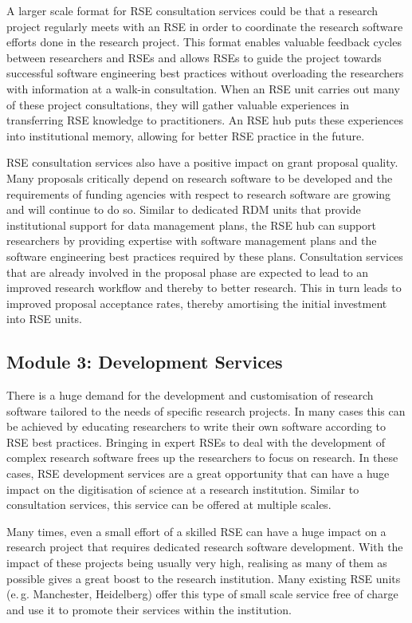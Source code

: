 \documentclass[a4paper]{article}
\makeatletter
\newcommand*{\eg}{e.\,g.\@\xspace}
\makeatother
\begin{document}
A larger scale format for RSE consultation services could be that a research project regularly meets with an RSE in order to coordinate the research software efforts done in the research project.
This format enables valuable feedback cycles between researchers and RSEs and allows RSEs to guide the project
towards successful software engineering best practices without overloading the researchers with information at a walk-in consultation.
When an RSE unit carries out many of these project consultations, they will gather valuable experiences in transferring RSE knowledge to practitioners.
An RSE hub puts these experiences into institutional memory, allowing for better RSE practice in the future.

RSE consultation services also have a positive impact on grant proposal quality.
Many proposals critically depend on research software to be developed and the requirements of funding agencies with respect to research software are growing and will continue to do so.
Similar to dedicated RDM units that provide institutional support for data management plans,
the RSE hub can support researchers by providing expertise with software management plans and the software engineering best practices required by these plans.
Consultation services that are already involved in the proposal phase are expected to lead to an improved research workflow and thereby to better research.
This in turn leads to improved proposal acceptance rates, thereby amortising the initial investment into RSE units.


\subsection{Module 3: Development Services}%
\label{sec:development}

There is a huge demand for the development and customisation of research software tailored to the needs of specific research projects.
In many cases this can be achieved by educating researchers to write their own software according to RSE best practices.
Bringing in expert RSEs to deal with the development of complex research software frees up the researchers to focus on research.
In these cases, RSE development services are a great opportunity that can have a huge impact on the digitisation of science at a research institution.
Similar to consultation services, this service can be offered at multiple scales.

Many times, even a small effort of a skilled RSE can have a huge impact on a research project that requires dedicated research software development.
With the impact of these projects being usually very high, realising as many of them as possible gives a great boost to the research institution.
Many existing RSE units (\eg{} Manchester, Heidelberg) offer this type of small scale service free of charge and use it to promote their services within the institution.
\end{document}
